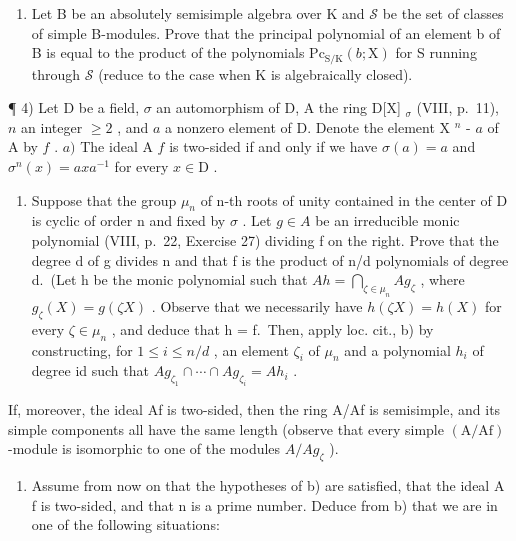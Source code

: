 \begin{enumerate}
\def\labelenumi{\alph{enumi})}
\setcounter{enumi}{1}
\tightlist
\item
  Let B be an absolutely semisimple algebra over K and \(\mathcal{S}\) be the set of classes of simple B-modules. Prove that the principal polynomial of an element b of B is equal to the product of the polynomials \(\mathrm{Pc}_{\mathrm{S}/\mathrm{K}}(b;\mathrm{X})\) for S running through \(\mathcal{S}\) (reduce to the case when K is algebraically closed).
\end{enumerate}

¶ 4) Let D be a field, \(\sigma\) an automorphism of D, A the ring D{[}X{]} \(_{\sigma}\) (VIII, p.~11), \(n\) an integer \(\geqslant 2\) , and \(a\) a nonzero element of D. Denote the element X \(^{n}\) - \(a\) of A by \(f\) . \(a)\) The ideal A \(f\) is two-sided if and only if we have \(\sigma(a) = a\) and \(\sigma^{n}(x) = axa^{-1}\) for every \(x \in \mathrm{D}\) .

\begin{enumerate}
\def\labelenumi{\alph{enumi})}
\setcounter{enumi}{1}
\tightlist
\item
  Suppose that the group \(\mu_{n}\) of n-th roots of unity contained in the center of D is cyclic of order n and fixed by \(\sigma\) . Let \(g \in A\) be an irreducible monic polynomial (VIII, p.~22, Exercise 27) dividing f on the right. Prove that the degree d of g divides n and that f is the product of n/d polynomials of degree d.~(Let h be the monic polynomial such that \(Ah = \bigcap_{\zeta \in \mu_{n}} Ag_{\zeta}\) , where \(g_{\zeta}(X) = g(\zeta X)\) . Observe that we necessarily have \(h(\zeta X) = h(X)\) for every \(\zeta \in \mu_{n}\) , and deduce that h = f.~Then, apply loc. cit., b) by constructing, for \(1 \leqslant i \leqslant n/d\) , an element \(\zeta_{i}\) of \(\mu_{n}\) and a polynomial \(h_{i}\) of degree id such that \(Ag_{\zeta_{1}} \cap \cdots \cap Ag_{\zeta_{i}} = Ah_{i}\) .
\end{enumerate}

If, moreover, the ideal Af is two-sided, then the ring A/Af is semisimple, and its simple components all have the same length (observe that every simple \((\mathrm{A}/\mathrm{Af})\) -module is isomorphic to one of the modules \(A/Ag_{\zeta}\) ).

\begin{enumerate}
\def\labelenumi{\alph{enumi})}
\setcounter{enumi}{2}
\tightlist
\item
  Assume from now on that the hypotheses of b) are satisfied, that the ideal A f is two-sided, and that n is a prime number. Deduce from b) that we are in one of the following situations:
\end{enumerate}

